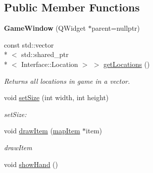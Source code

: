 \subsection*{Public Member Functions}
\begin{DoxyCompactItemize}
\item 
\hypertarget{class_game_window_ac3eeb92ff59cb36fd579f290013db4d5}{{\bfseries Game\-Window} (Q\-Widget $\ast$parent=nullptr)}\label{class_game_window_ac3eeb92ff59cb36fd579f290013db4d5}

\item 
const std\-::vector\\*
$<$ std\-::shared\-\_\-ptr\\*
$<$ Interface\-::\-Location $>$ $>$ \hyperlink{class_game_window_ad4135d0860c707bbdb886960fd987c9d}{get\-Locations} ()
\begin{DoxyCompactList}\small\item\em Returns all locations in game in a vector. \end{DoxyCompactList}\item 
void \hyperlink{class_game_window_ad87474fba49f18ccc7c58c6a9b2bf718}{set\-Size} (int width, int height)
\begin{DoxyCompactList}\small\item\em set\-Size\-: \end{DoxyCompactList}\item 
void \hyperlink{class_game_window_a1dae2240eb2db87efd565f5bc76f8697}{draw\-Item} (\hyperlink{classmap_item}{map\-Item} $\ast$item)
\begin{DoxyCompactList}\small\item\em draw\-Item \end{DoxyCompactList}\item 
\hypertarget{class_game_window_ad651fee2b907d4c61d806f8fbe0bdd13}{void \hyperlink{class_game_window_ad651fee2b907d4c61d806f8fbe0bdd13}{show\-Hand} ()}\label{class_game_window_ad651fee2b907d4c61d806f8fbe0bdd13}


\end{DoxyCompactItemize}
